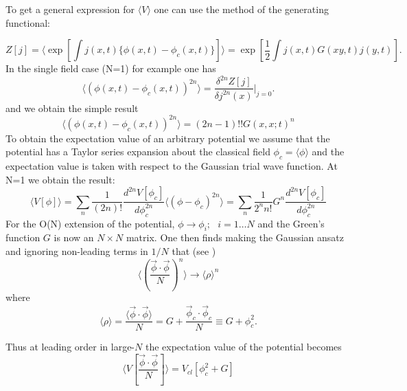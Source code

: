 \documentclass[a4paper,prd,preprint,superscriptaddress,showpacs,byrevtex]{revtex4}
\begin{document}
To get a general expression for $ \langle V \rangle$  one can use the
method of the generating functional:

\begin{equation}
Z[j] = \langle \exp[\int j(x,t) \{ \phi(x,t) - \phi_c(x,t) \} ] \rangle = \exp
[\frac{1}{2} \int j(x,t) G(xy,t) j(y,t)].
\end{equation}
In the single field case (N=1) for example one has
\begin{equation}
\langle (\phi(x,t)-\phi_c(x,t)) ^{2n} \rangle = \frac{\delta ^{2n}
Z[j]}{\delta j^{2n} (x)} |_{j=0}.
\end{equation}
and we obtain the simple result
\begin{equation}
\langle (\phi(x,t)- \phi_c(x,t)) ^{2n} \rangle = (2n-1)!!  G(x,x;t)^{n}
\end{equation}
To obtain the expectation value of an arbitrary potential we assume that the
potential
has a Taylor series expansion about  the classical  field $\phi_c = \langle
\phi \rangle$ and  the expectation value is taken with respect to the
Gaussian
trial wave function.   At N=1 we obtain the result:
\begin{equation}
\langle V[\phi] \rangle = \sum_n \frac{1}{(2n)!} \frac {d^{2n} V[\phi_c]}{d
\phi_c^{2n}} \langle (\phi-\phi_c)^{2n} \rangle = \sum_n \frac{1}{2^n n!}
G^n  \frac {d^{2n} V[\phi_c]}{d \phi_c^{2n}}
\end{equation}
For the O(N) extension of the potential, $ \phi \rightarrow \phi_i;~~~i=1
\ldots N $ and the Green's function $G$ is now an  $N \times  N$ matrix. One
then finds making the Gaussian ansatz and ignoring non-leading terms in
$1/N$ that (see \cite{ref:BMB})
 \begin{equation}
\langle ( \frac {\vec \phi \cdot \vec \phi}{N})^n \rangle \rightarrow
\langle
\rho \rangle^n \end{equation}
where
\begin{equation}
\langle \rho \rangle =  \frac {\langle \vec \phi \cdot  \vec \phi
\rangle}{N}
= G + \frac {\vec \phi_c \cdot \vec \phi_c}{N} \equiv G+\phi_c^2  .
\end{equation}

Thus at leading order in large-$N$ the expectation value of the potential
becomes  \begin{equation}
\langle V[\frac {\vec \phi \cdot \vec \phi}{N} ] \rangle = V_{cl} [ \phi_c^2
+
G ] \end{equation}
\end{document}
